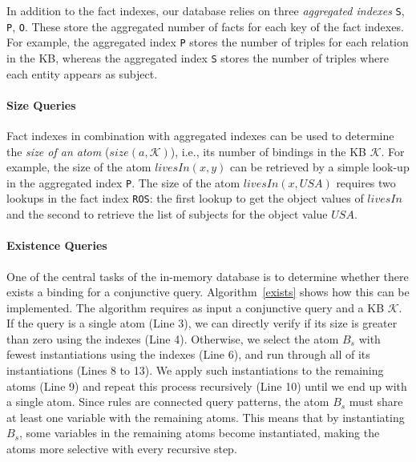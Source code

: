 %

In addition to the fact indexes, our database relies on three \emph{aggregated indexes} \texttt{S}, \texttt{P}, \texttt{O}. These store the aggregated number of facts for each
key of the fact indexes. For example, the aggregated index \texttt{P} stores the number of triples for each relation in the KB, whereas the aggregated index \texttt{S} stores the number of triples where each entity appears as subject.

\paragraph{Size Queries} Fact indexes in combination with aggregated indexes can be used to determine the \emph{size of an atom} ($size(a,\mathcal{K})$), i.e., its number of bindings in the KB $\mathcal{K}$. For example, the size of the atom $livesIn(x,y)$ can be retrieved by a simple look-up
in the aggregated index \texttt{P}. The size of the atom $livesIn(x, USA)$ requires two
lookups in the fact index \texttt{ROS}: the first lookup to get the object values of $livesIn$ and the second
to retrieve the list of subjects for the object value $USA$.

\paragraph{Existence Queries} One of the central tasks of the in-memory database is to determine whether there exists a binding for a conjunctive query. Algorithm~\ref{exists} shows how this can be implemented.  The algorithm requires as input a conjunctive query and a KB $\mathcal{K}$.
If the query is a single atom (Line 3), we can directly verify if its size is greater than zero using
the indexes (Line 4). Otherwise, we select the atom $B_s$ with fewest instantiations using the indexes (Line 6),
and run through all of its instantiations (Lines 8 to 13). We apply such instantiations to the remaining atoms (Line 9)
and repeat this process recursively (Line 10) until we end up with a single atom. Since rules are connected query patterns, the atom $B_s$ must share at least
one variable with the remaining atoms. This means that by instantiating $B_s$, some variables in the remaining atoms
become instantiated, making the atoms more selective with every recursive step.

